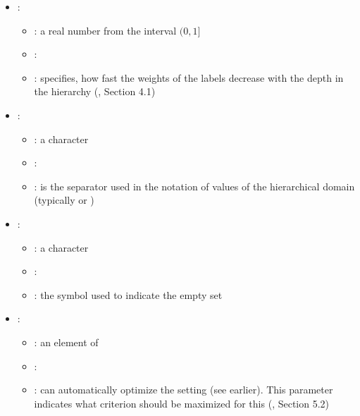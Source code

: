 \begin{itemize}
\begin{itemize}
           \end{itemize}
    \item {}:
           \begin{itemize}
                \item \optionPossibleValues{}: a real number from the interval $(0, 1]$
                \item \optionDefaultValue{}: 
                \item \optionDescrption{}: specifies, how fast the weights of the labels decrease with the depth in the hierarchy (\cite{Vens08:jrnl}, Section 4.1)
           \end{itemize}
    \item {}:
           \begin{itemize}
                \item \optionPossibleValues{}: a character
                \item \optionDefaultValue{}: 
                \item \optionDescrption{}: is the separator used in the notation of values of the hierarchical domain (typically \formatOneElement{/} or ) 
           \end{itemize}
    \item {}:
           \begin{itemize}
                \item \optionPossibleValues{}: a character
                \item \optionDefaultValue{}: 
                \item \optionDescrption{}: the symbol used to indicate the empty set
           \end{itemize}
    \item {}:
           \begin{itemize}
                \item \optionPossibleValues{}: an element of 
                \item \optionDefaultValue{}: 
                \item \optionDescrption{}: \clus{} can automatically optimize the  setting (see earlier). This parameter indicates what criterion should be maximized for this (\cite{Vens08:jrnl}, Section 5.2)

\end{itemize}
\end{itemize}
